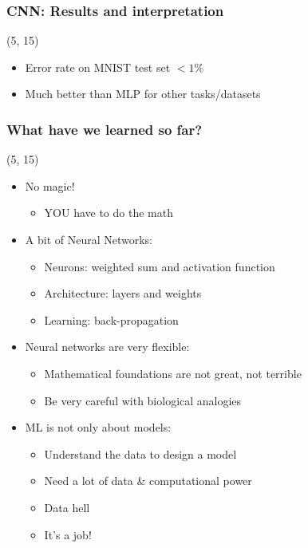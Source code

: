 \begin{frame}
  \frametitle{\acl{CNN}: Results and interpretation}

  \begin{textblock}{90}(5, 15)
    \begin{itemize}
    \item Error rate on MNIST test set $< 1\%$
    \item<2-> Much better than \ac{MLP} for other tasks/datasets
    \end{itemize}
  \end{textblock}
\end{frame}


\begin{frame}
  \frametitle{What have we learned so far?}

  \begin{textblock}{90}(5, 15)
    \begin{itemize}
    \item<1-> No magic!
      \begin{itemize}
      \item YOU have to do the math
      \end{itemize}
    \item<2-> A bit of Neural Networks:
      \begin{itemize}
      \item Neurons: weighted sum and activation function
      \item Architecture: layers and weights
      \item Learning: back-propagation
      \end{itemize}
    \item<3-> Neural networks are very flexible:
      \begin{itemize}
      \item Mathematical foundations are not great, not terrible
      \item Be very careful with biological analogies
      \end{itemize}
    \item<4-> ML is not only about models:
      \begin{itemize}
      \item Understand the data to design a model
      \item Need a lot of data \& computational power
      \item Data hell
      \item It's a job!
      \end{itemize}
    \end{itemize}
  \end{textblock}
\end{frame}
